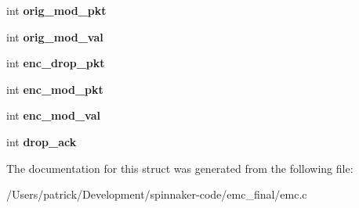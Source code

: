 \begin{DoxyCompactItemize}
\item 
int {\bfseries orig\+\_\+mod\+\_\+pkt}\hypertarget{structfault__t_ab90d237fbd386e462a2d7ada0bb23ddc}{}\label{structfault__t_ab90d237fbd386e462a2d7ada0bb23ddc}

\item 
int {\bfseries orig\+\_\+mod\+\_\+val}\hypertarget{structfault__t_a9cbebb99462babfedff3eb5040c42621}{}\label{structfault__t_a9cbebb99462babfedff3eb5040c42621}

\item 
int {\bfseries enc\+\_\+drop\+\_\+pkt}\hypertarget{structfault__t_ae864b6a814aec7c92b5c9191096a1c5c}{}\label{structfault__t_ae864b6a814aec7c92b5c9191096a1c5c}

\item 
int {\bfseries enc\+\_\+mod\+\_\+pkt}\hypertarget{structfault__t_a5b1a06b11fe2ad4654ce57e45143a853}{}\label{structfault__t_a5b1a06b11fe2ad4654ce57e45143a853}

\item 
int {\bfseries enc\+\_\+mod\+\_\+val}\hypertarget{structfault__t_a1f951405e894d046c4f91f7c2b043cd6}{}\label{structfault__t_a1f951405e894d046c4f91f7c2b043cd6}

\item 
int {\bfseries drop\+\_\+ack}\hypertarget{structfault__t_aff917adcd04ba5cba3feb1cf78102045}{}\label{structfault__t_aff917adcd04ba5cba3feb1cf78102045}

\end{DoxyCompactItemize}


The documentation for this struct was generated from the following file\+:\begin{DoxyCompactItemize}
\item 
/\+Users/patrick/\+Development/spinnaker-\/code/emc\+\_\+final/emc.\+c\end{DoxyCompactItemize}
